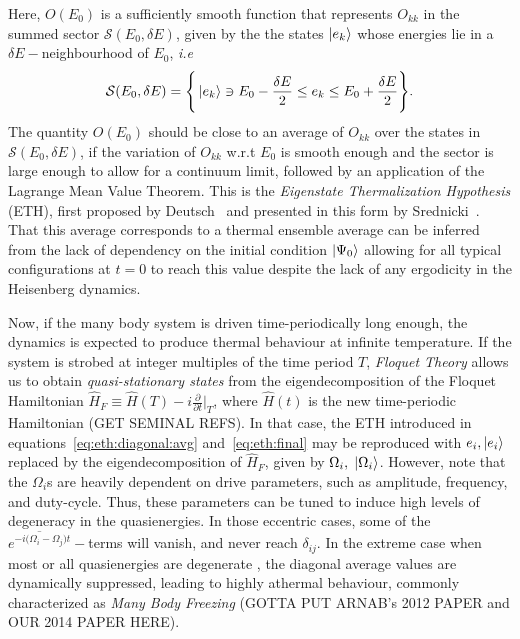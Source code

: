 \documentclass[%
 reprint,
superscriptaddress,
 amsmath,amssymb,
 aps,
prb,
]{revtex4-2}
\begin{document}
Here, $O(E_0)$ is a sufficiently smooth function that represents $O_{kk}$ in the summed sector $\mathcal{S}(E_0, \delta E)$, given by the the states $\ket{e_k}$ whose energies lie in a $\delta E-$neighbourhood of $E_0$, \textit{i.e} 
\begin{equation}
\mathcal{S}(E_0, \delta E) = \Bigg\{\ket{e_k}\ni E_0-\frac{\delta E}{2}\leq e_k \leq E_0+\frac{\delta E}{2}\Bigg\}.
\end{equation}
The quantity $O(E_0)$ should be close to an average of $O_{kk}$ over the states in $\mathcal{S}(E_0, \delta E)$, if the variation of $O_{kk}$ w.r.t $E_0$ is smooth enough and the sector is large enough to allow for a continuum limit, followed by an application of the Lagrange Mean Value Theorem. This is the \textit{Eigenstate Thermalization Hypothesis} (ETH), first proposed by Deutsch~\cite{Deutsch1991} and presented in this form by Srednicki~\cite{Srednicki1994}. That this average corresponds to a thermal ensemble average can be inferred from the lack of dependency on the initial condition $\ket{\Psi_0}$ allowing for all typical configurations at $t=0$ to reach this value despite the lack of any ergodicity in the Heisenberg dynamics.

Now, if the many body system is driven time-periodically long enough, the dynamics is expected to produce thermal behaviour at infinite temperature. If the system is strobed at integer multiples of the time period $T$, \emph{Floquet Theory} allows us to obtain \textit{quasi-stationary states} from the eigendecomposition of the Floquet Hamiltonian $\hat{H}_F\equiv \hat{H}(T) - i \frac{\partial}{\partial t}\vert_T$, where $\hat{H}(t)$ is the new time-periodic Hamiltonian (GET SEMINAL REFS). In that case, the ETH introduced in equations~\ref{eq:eth:diagonal:avg} and~\ref{eq:eth:final} may be reproduced with $e_i, \ket{e_i}$ replaced by the eigendecomposition of $\hat{H}_F$, given by $\Omega_i,\; \ket{\Omega_i}$. However, note that the $\Omega_i$s are heavily dependent on drive parameters, such as amplitude, frequency, and duty-cycle. Thus, these parameters can be tuned to induce high levels of degeneracy in the quasienergies. In those eccentric cases,  some of the $\overline{e^{-i\big(\Omega_i-\Omega_j\big)t}}-$terms will vanish, and never reach $\delta_{ij}$. In the extreme case when most or all quasienergies are degenerate , the diagonal average values are dynamically suppressed, leading to highly athermal behaviour, commonly characterized as  \textit{Many Body Freezing} (GOTTA PUT ARNAB's 2012 PAPER and OUR 2014 PAPER HERE). 
\end{document}
